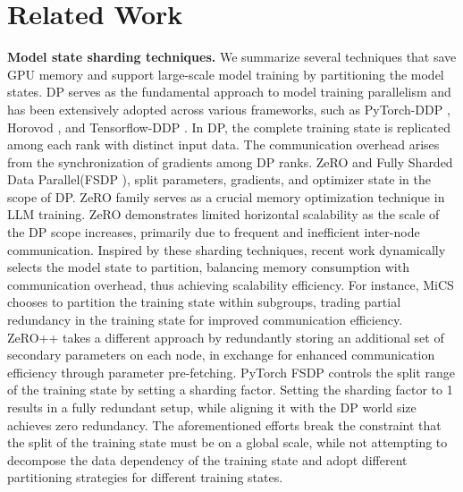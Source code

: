 

\section{Related Work}
\noindent\textbf{Model state sharding techniques.} We summarize several techniques that save GPU memory and support large-scale model training by partitioning the model states. 
DP \cite{DemystifyingParallelandDistributedDeepLearning} serves as the fundamental approach to model training parallelism and has been extensively adopted across various frameworks, such as PyTorch-DDP \cite{PyTorchDistributed}, Horovod \cite{Horovod}, and Tensorflow-DDP \cite{TensorFlow}. In DP, the complete training state is replicated among each rank with distinct input data. The communication overhead arises from the synchronization of gradients among DP ranks.
ZeRO \cite{ZeRO} and Fully Sharded Data Parallel(FSDP \cite{xu2020automatic}), split parameters, gradients, and optimizer state in the scope of DP. ZeRO family serves as a crucial memory optimization technique in LLM training. ZeRO demonstrates limited horizontal scalability as the scale of the DP scope increases, primarily due to frequent and inefficient inter-node communication. Inspired by these sharding techniques, recent work dynamically selects the model state to partition, balancing memory consumption with communication overhead, thus achieving scalability efficiency. For instance, MiCS\cite{MiCS} chooses to partition the training state within subgroups, trading partial redundancy in the training state for improved communication efficiency. ZeRO++\cite{ZeRO++} takes a different approach by redundantly storing an additional set of secondary parameters on each node, in exchange for enhanced communication efficiency through parameter pre-fetching. PyTorch FSDP\cite{PyTorchFSDP} controls the split range of the training state by setting a sharding factor. Setting the sharding factor to 1 results in a fully redundant setup, while aligning it with the DP world size achieves zero redundancy. The aforementioned efforts break the constraint that the split of the training state must be on a global scale, while not attempting to decompose the data dependency of the training state and adopt different partitioning strategies for different training states. 

